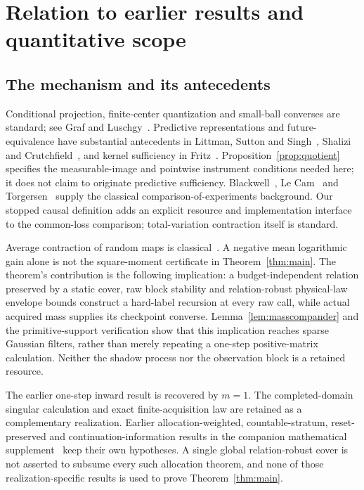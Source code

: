 \section{Relation to earlier results and quantitative scope}\label{sec:comparison}
\subsection{The mechanism and its antecedents}
Conditional projection, finite-center quantization and small-ball converses are standard; see Graf and Luschgy~\cite{graf}. Predictive representations and future-equivalence have substantial antecedents in Littman, Sutton and Singh~\cite{psr}, Shalizi and Crutchfield~\cite{shalizi}, and kernel sufficiency in Fritz~\cite{fritz}. Proposition~\ref{prop:quotient} specifies the measurable-image and pointwise instrument conditions needed here; it does not claim to originate predictive sufficiency. Blackwell~\cite{blackwell}, Le Cam~\cite{lecam} and Torgersen~\cite{torgersen} supply the classical comparison-of-experiments background. Our stopped causal definition adds an explicit resource and implementation interface to the common-loss comparison; total-variation contraction itself is standard.

Average contraction of random maps is classical~\cite{diaconis}. A negative mean logarithmic gain alone is not the square-moment certificate in Theorem~\ref{thm:main}. The theorem's contribution is the following implication: a budget-independent relation preserved by a static cover, raw block stability and relation-robust physical-law envelope bounds construct a hard-label recursion at every raw call, while actual acquired mass supplies its checkpoint converse. Lemma~\ref{lem:masscompander} and the primitive-support verification show that this implication reaches sparse Gaussian filters, rather than merely repeating a one-step positive-matrix calculation. Neither the shadow process nor the observation block is a retained resource.

The earlier one-step inward result is recovered by $m=1$. The completed-domain singular calculation and exact finite-acquisition law are retained as a complementary realization. Earlier allocation-weighted, countable-stratum, reset-preserved and continuation-information results in the companion mathematical supplement~\cite{supplement} keep their own hypotheses. A single global relation-robust cover is not asserted to subsume every such allocation theorem, and none of those realization-specific results is used to prove Theorem~\ref{thm:main}.

